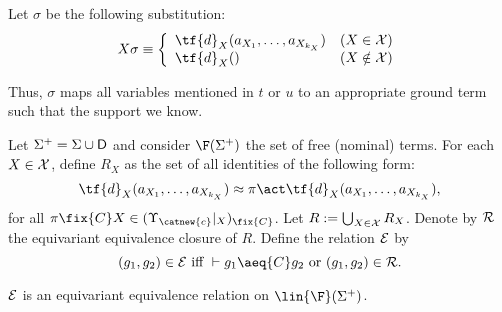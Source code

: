 \begin{definition}
    Let $\sigma$ be the following substitution:
    \[
        X\sigma \equiv \left\{\begin{array}{ll}
            \tf{d}_X(a_{X_1},\ldots,a_{X_{k_X}}) &  (X\in\mathcal{X})\\
            \tf{d}_X() & (X\notin\mathcal{X})
        \end{array}\right.
    \]
\end{definition}

Thus, $\sigma$ maps all variables mentioned in $t$ or $u$ to an appropriate ground term such that the support we know.

Let $\Sigma^+ = \Sigma\cup\sf{D}$ and consider $\F(\Sigma^+)$ the set of free (nominal) terms. For each $X\in{\cal X}$, define $R_X$ as the set of all identities of the following form:
\[
    \tf{d}_X(a_{X_1},\ldots,a_{X_{k_X}}) \approx \pi\act \tf{d}_X(a_{X_1},\ldots,a_{X_{k_X}}),
\]
for all $\pi\fix{C} X\in (\Upsilon_{\catnew{c}}|_X)_{\fix{C}}$. Let $R := \bigcup_{X\in{\cal X}} R_X$. Denote by ${\cal R}$ the equivariant equivalence closure of $R$. Define the relation ${\cal E}$ by
\[
    (g_1,g_2)\in {\cal E} \text{ iff } \vdash g_1\aeq{C} g_2 \text{ or } (g_1,g_2)\in {\cal R}.
\]

\begin{lemma}
    ${\cal E}$ is an equivariant equivalence relation on $\lin{\F}(\Sigma^+)$.
\end{lemma}

